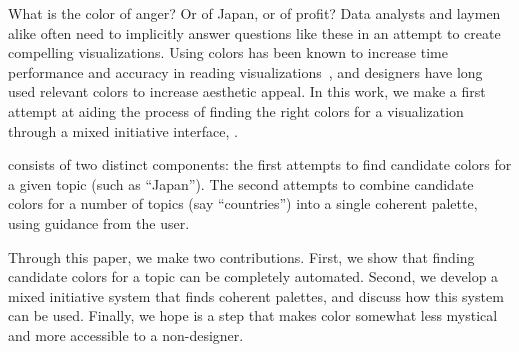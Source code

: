 What is the color of anger? Or of Japan, or of profit? Data analysts and laymen alike often need to implicitly answer questions like these in an attempt to create compelling visualizations. Using colors has been known to increase time performance and accuracy in reading visualizations~\cite{hoadley1990investigating}, and designers have long used relevant colors to increase aesthetic appeal. In this work, we make a first attempt at aiding the process of finding the right colors for a visualization through a mixed initiative interface, \system.

\system consists of two distinct components: the first attempts to find candidate colors for a given topic (such as ``Japan''). The second attempts to combine candidate colors for a number of topics (say ``countries'') into a single coherent palette, using guidance from the user.

Through this paper, we make two contributions. First, we show that finding candidate colors for a topic can be completely automated. Second, we develop a mixed initiative system that finds coherent palettes, and discuss how this system can be used. Finally, we hope \system is a step that makes color somewhat less mystical and more accessible to a non-designer.
